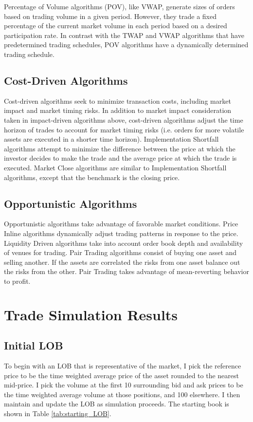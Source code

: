 Percentage of Volume algorithms (POV), like VWAP, generate sizes of orders based on trading volume in a given period. However, they trade a fixed percentage of the current market volume in each period based on a desired participation rate. In contrast with the TWAP and VWAP algorithms that have predetermined trading schedules, POV algorithms have a dynamically determined trading schedule.

\subsection{Cost-Driven Algorithms}
Cost-driven algorithms seek to minimize transaction costs, including market impact and market timing risks. In addition to market impact consideration taken in impact-driven algorithms above, cost-driven algorithms adjust the time horizon of trades to account for market timing risks (i.e. orders for more volatile assets are executed in a shorter time horizon). Implementation Shortfall algorithms attempt to minimize the difference between the price at which the investor decides to make the trade and the average price at which the trade is executed. Market Close algorithms are similar to Implementation Shortfall algorithms, except that the benchmark is the closing price.

\subsection{Opportunistic Algorithms}
Opportunistic algorithms take advantage of favorable market conditions. Price Inline algorithms dynamically adjust trading patterns in response to the price. Liquidity Driven algorithms take into account order book depth and availability of venues for trading. Pair Trading algorithms consist of buying one asset and selling another. If the assets are correlated the risks from one asset balance out the risks from the other. Pair Trading takes advantage of mean-reverting behavior to profit. 


\section{Trade Simulation Results} \label{ch:sim_results}
\subsection{Initial LOB}
To begin with an LOB that is representative of the market, I pick the reference price to be the time weighted average price of the asset rounded to the nearest mid-price. I pick the volume at the first 10 surrounding bid and ask prices to be the time weighted average volume at those positions, and 100 elsewhere. I then maintain and update the LOB as simulation proceeds. The starting book is shown in Table \ref{tab:starting_LOB}.

